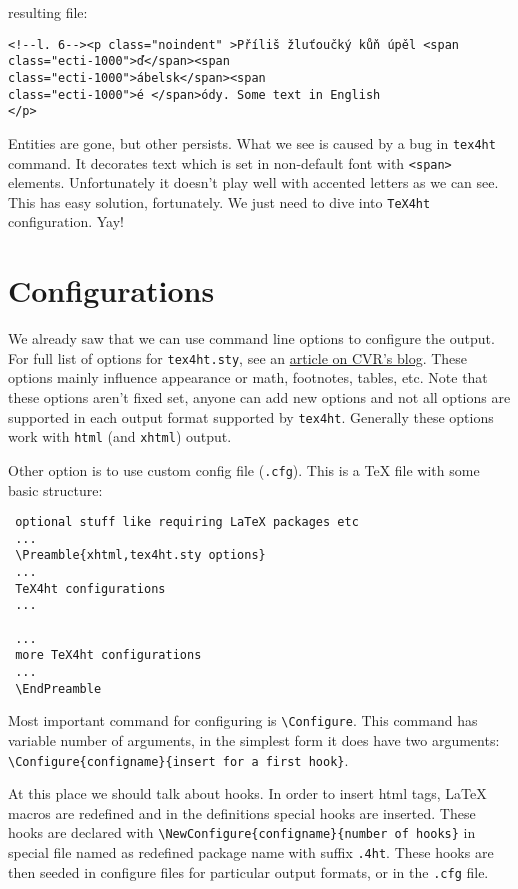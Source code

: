 resulting file:

\begin{verbatim}
<!--l. 6--><p class="noindent" >Příliš žluťoučký kůň úpěl <span 
class="ecti-1000">ď</span><span 
class="ecti-1000">ábelsk</span><span 
class="ecti-1000">é </span>ódy. Some text in English
</p> 
\end{verbatim}

Entities are gone, but other persists. What we see is caused by a bug in
\texttt{tex4ht} command. It decorates text which is set in non-default
font with \texttt{\textless{}span\textgreater{}} elements. Unfortunately
it doesn't play well with accented letters as we can see. This has easy
solution, fortunately. We just need to dive into \texttt{TeX4ht}
configuration. Yay!

\hypertarget{configurations}{%
\section{Configurations}\label{configurations}}

We already saw that we can use command line options to configure the
output. For full list of options for \texttt{tex4ht.sty}, see an
\href{http://www.cvr.cc/?p=504}{article on CVR's blog}. These options
mainly influence appearance or math, footnotes, tables, etc. Note that
these options aren't fixed set, anyone can add new options and not all
options are supported in each output format supported by
\texttt{tex4ht}. Generally these options work with \texttt{html} (and
\texttt{xhtml}) output.

Other option is to use custom config file (\texttt{.cfg}). This is a TeX
file with some basic structure:

\begin{verbatim}
 optional stuff like requiring LaTeX packages etc
 ...
 \Preamble{xhtml,tex4ht.sty options}
 ...
 TeX4ht configurations
 ...
  
 ...
 more TeX4ht configurations
 ...
 \EndPreamble
\end{verbatim}

Most important command for configuring is
\texttt{\textbackslash{}Configure}. This command has variable number of
arguments, in the simplest form it does have two arguments:
\texttt{\textbackslash{}Configure\{configname\}\{insert\ for\ a\ first\ hook\}}.

At this place we should talk about hooks. In order to insert html tags,
LaTeX macros are redefined and in the definitions special hooks are
inserted. These hooks are declared with
\texttt{\textbackslash{}NewConfigure\{configname\}\{number\ of\ hooks\}}
in special file named as redefined package name with suffix
\texttt{.4ht}. These hooks are then seeded in configure files for
particular output formats, or in the \texttt{.cfg} file.

